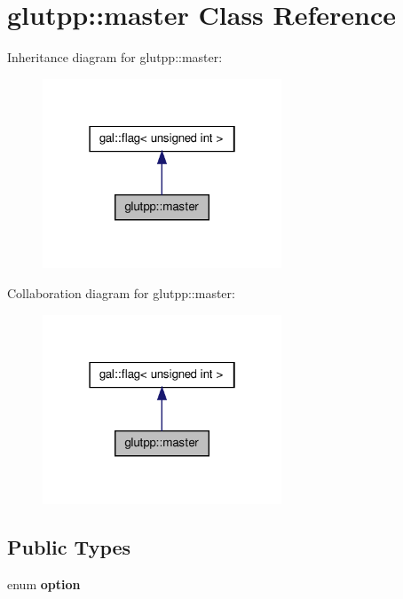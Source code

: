 \hypertarget{classglutpp_1_1master}{\section{glutpp\-:\-:master \-Class \-Reference}
\label{classglutpp_1_1master}
}


\-Inheritance diagram for glutpp\-:\-:master\-:\nopagebreak
\begin{figure}[H]
\begin{center}
\leavevmode
\includegraphics[width=202pt]{classglutpp_1_1master__inherit__graph}
\end{center}
\end{figure}


\-Collaboration diagram for glutpp\-:\-:master\-:\nopagebreak
\begin{figure}[H]
\begin{center}
\leavevmode
\includegraphics[width=202pt]{classglutpp_1_1master__coll__graph}
\end{center}
\end{figure}
\subsection*{\-Public \-Types}
\begin{DoxyCompactItemize}
\item 
enum {\bfseries option} 
\end{DoxyCompactItemize}
